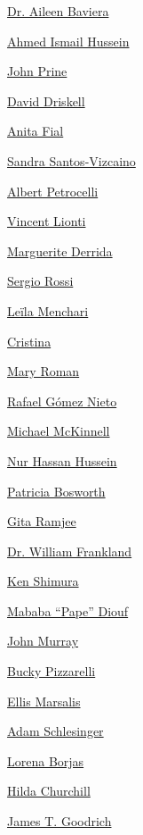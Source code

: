 \protect\hyperlink{dr-aileen-baviera}{Dr. Aileen Baviera}

\protect\hyperlink{ahmed-ismail-hussein}{Ahmed Ismail Hussein}

\protect\hyperlink{john-prine}{John Prine}

\protect\hyperlink{david-driskell}{David Driskell}

\protect\hyperlink{anita-fial}{Anita Fial}

\protect\hyperlink{sandra-santosvizcaino}{Sandra Santos-Vizcaino}

\protect\hyperlink{albert-petrocelli}{Albert Petrocelli}

\protect\hyperlink{vincent-lionti}{Vincent Lionti}

\protect\hyperlink{marguerite-derrida}{Marguerite Derrida}

\protect\hyperlink{sergio-rossi}{Sergio Rossi}

\protect\hyperlink{leuxefla-menchari}{Leïla Menchari}

\protect\hyperlink{cristina}{Cristina}

\protect\hyperlink{mary-roman}{Mary Roman}

\protect\hyperlink{rafael-guxf3mez-nieto}{Rafael Gómez Nieto}

\protect\hyperlink{michael-mckinnell}{Michael McKinnell}

\protect\hyperlink{nur-hassan-hussein}{Nur Hassan Hussein}

\protect\hyperlink{patricia-bosworth}{Patricia Bosworth}

\protect\hyperlink{gita-ramjee}{Gita Ramjee}

\protect\hyperlink{dr-william-frankland}{Dr. William Frankland}

\protect\hyperlink{ken-shimura}{Ken Shimura}

\protect\hyperlink{mababa-ux201cpapeux201d-diouf}{Mababa ``Pape'' Diouf}

\protect\hyperlink{john-murray}{John Murray}

\protect\hyperlink{bucky-pizzarelli}{Bucky Pizzarelli}

\protect\hyperlink{ellis-marsalis}{Ellis Marsalis}

\protect\hyperlink{adam-schlesinger}{Adam Schlesinger}

\protect\hyperlink{lorena-borjas}{Lorena Borjas}

\protect\hyperlink{hilda-churchill}{Hilda Churchill}

\protect\hyperlink{james-t-goodrich}{James T. Goodrich}

